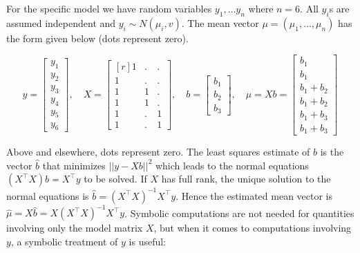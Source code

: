 \documentclass[10pt,]{article}
\newenvironment{Shaded}{\begin{snugshade}}{\end{snugshade}}
\newcommand{\KeywordTok}[1]{\textcolor[rgb]{0.13,0.29,0.53}{\textbf{#1}}}
\newcommand{\NormalTok}[1]{#1}
\newcommand{\OperatorTok}[1]{\textcolor[rgb]{0.81,0.36,0.00}{\textbf{#1}}}
\newcommand{\StringTok}[1]{\textcolor[rgb]{0.31,0.60,0.02}{#1}}
\begin{document}
For the specific model we have random variables \(y_1,\dots y_n\) where
\(n=6\). All \(y_i\)s are assumed independent and
\(y_i\sim N(\mu_i, v)\). The mean vector \(\mu=(\mu_1,\dots,\mu_n)\) has
the form given below (dots represent zero).

\[
y = \left[\begin{matrix}y_{1}\\y_{2}\\y_{3}\\y_{4}\\y_{5}\\y_{6}\end{matrix}\right], \quad X=\left[\begin{matrix}[r]1 & . & .\\1 & . & .\\1 & 1 & .\\1 & 1 & .\\1 & . & 1\\1 & . & 1\end{matrix}\right], \quad b=\left[\begin{matrix}b_{1}\\b_{2}\\b_{3}\end{matrix}\right], \quad  \mu = X b = \left[\begin{matrix}b_{1}\\b_{1}\\b_{1} + b_{2}\\b_{1} + b_{2}\\b_{1} + b_{3}\\b_{1} + b_{3}\end{matrix}\right]
\]

Above and elsewhere, dots represent zero. The least squares estimate of
\(b\) is the vector \(\hat {b}\) that minimizes \(||y-X {b}||^2\) which
leads to the normal equations \((X^\top X){b}= X^\top y\) to be solved.
If \(X\) has full rank, the unique solution to the normal equations is
\(\hat {b}= (X^\top X)^{-1} X^\top y\). Hence the estimated mean vector
is \(\hat \mu = X\hat{b}=X(X^\top X)^{-1} X^\top y\). Symbolic
computations are not needed for quantities involving only the model
matrix \(X\), but when it comes to computations involving \(y\), a
symbolic treatment of \(y\) is useful:

\begin{Shaded}
\end{Shaded}
\end{document}

